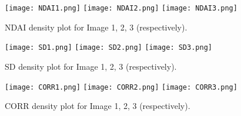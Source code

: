 \documentclass{article}\usepackage[]{graphicx}\usepackage[]{color}
\begin{document}
\begin{figure}[H]
  \texttt{[image: NDAI1.png]}
\endminipage\hfill
{}
  \texttt{[image: NDAI2.png]}
\endminipage\hfill
{}%
  \texttt{[image: NDAI3.png]}
\endminipage
  \caption{NDAI density plot for Image 1, 2, 3 (respectively).}\label{}
\end{figure}

\begin{figure}[H]
  \texttt{[image: SD1.png]}
\endminipage\hfill
{}
  \texttt{[image: SD2.png]}
\endminipage\hfill
{}%
  \texttt{[image: SD3.png]}
\endminipage
  \caption{SD density plot for Image 1, 2, 3 (respectively).}
\end{figure}

\begin{figure}[H]
  \texttt{[image: CORR1.png]}
\endminipage\hfill
{}
  \texttt{[image: CORR2.png]}
\endminipage\hfill
{}%
  \texttt{[image: CORR3.png]}
\endminipage
  \caption{CORR density plot for Image 1, 2, 3 (respectively).}\label{}
\end{figure}
\end{document}
